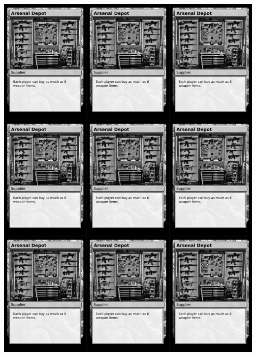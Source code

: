 \documentclass[a4paper]{article}
\begin{document}
\newpage

\begin{center}
	\centering
	\includegraphics[width=200.5mm,height=280.7mm]{output/temp/page22.png}
\end{center}
\end{document}
